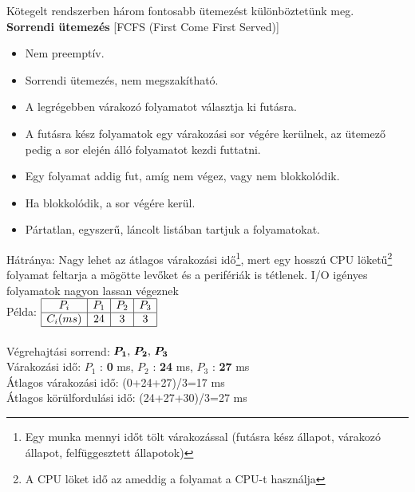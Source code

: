 \documentclass[tikz,12pt,margin=0px]{article}
\begin{document}
    \noindent Kötegelt rendszerben három fontosabb ütemezést különböztetünk meg.\\

    \noindent \textbf{Sorrendi ütemezés} [FCFS (First Come First Served)]

    \begin{itemize}[topsep=8pt,itemsep=4pt,partopsep=4pt, parsep=4pt]
        \item Nem preemptív.
        \item Sorrendi ütemezés, nem megszakítható.
        \item A legrégebben várakozó folyamatot választja ki futásra.
        \item A futásra kész folyamatok egy várakozási sor végére kerülnek, az ütemező pedig a sor elején álló folyamatot kezdi futtatni.
		\item Egy folyamat addig fut, amíg nem végez, vagy nem blokkolódik.
		\item Ha blokkolódik, a sor végére kerül.
		\item Pártatlan, egyszerű, láncolt listában tartjuk a folyamatokat.
    \end{itemize}

    \noindent Hátránya: Nagy lehet az átlagos várakozási idő\footnote{Egy munka mennyi időt tölt várakozással (futásra kész állapot, várakozó állapot, felfüggesztett állapotok)}, mert egy hosszú CPU löketű\footnote{A CPU löket idő az ameddig a folyamat a CPU-t használja} folyamat feltarja a mögötte levőket és a perifériák is tétlenek. I/O igényes folyamatok nagyon lassan végeznek\\

    \noindent Példa: $\begin{array}{|c|c|c|c|}
                        \hline
                         P_{i} & P_{1} & P_{2} & P_{3} \\ \hline
                         C_{i}(ms) & 24 & 3 & 3 \\ \hline
                       \end{array}$\\\\

    \noindent Végrehajtási sorrend: $\boldsymbol{P_1$, $P_2$, $P_3}$\\
    \noindent Várakozási idő: $P_1$ : \textbf{0} ms, $P_2$ : \textbf{24} ms, $P_3$ : \textbf{27} ms\\

    \noindent  Átlagos várakozási idő: (0+24+27)/3=17 ms\\
    \noindent  Átlagos körülfordulási idő: (24+27+30)/3=27 ms  
\end{document}
